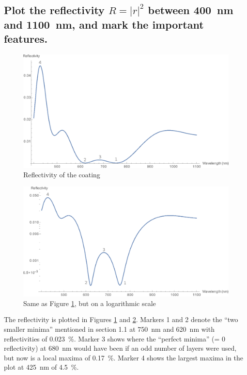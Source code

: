 \documentclass[a4paper]{scrartcl}
\begin{document}
\subsection{Plot the reflectivity \(R = |r|^2\) between \SI{400}{\nano\metre} and \SI{1100}{\nano\metre}, and mark the important features.}
\begin{figure}
    \centering
    \includegraphics[width = 18cm]{reflectivity-lin.png}
    \caption{Reflectivity of the coating}
    \label{fig:reflectivity-lin}
\end{figure}
\begin{figure}
    \centering
    \includegraphics[width = 18cm]{reflectivity-log.png}
    \caption{Same as Figure \ref{fig:reflectivity-lin}, but on a logarithmic scale}
    \label{fig:reflectivity-log}
\end{figure}

The reflectivity is plotted in Figures \ref{fig:reflectivity-lin} and \ref{fig:reflectivity-log}. Markers 1 and 2 denote the ``two smaller minima'' mentioned in section 1.1 at \SI{750}{\nano\metre} and \SI{620}{\nano\metre} with reflectivities of \SI{0.023}{\percent}. Marker 3 shows where the ``perfect minima'' (= 0 reflectivity) at \SI{680}{\nano\metre} would have been if an odd number of layers were used, but now is a local maxima of \SI{0.17}{\percent}. Marker 4 shows the largest maxima in the plot at \SI{425}{\nano\metre} of \SI{4.5}{\percent}.
\end{document}
